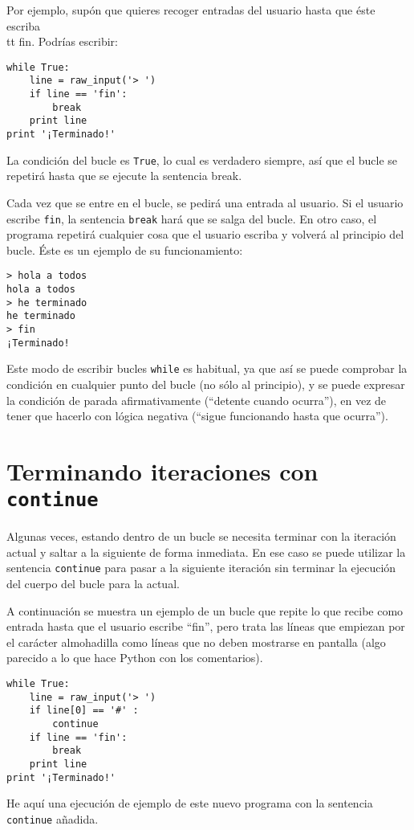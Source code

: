 Por ejemplo, supón que quieres recoger entradas del usuario hasta que
éste escriba {\\tt fin}. Podrías escribir:

\beforeverb
\begin{verbatim}
while True:
    line = raw_input('> ')
    if line == 'fin':
        break
    print line
print '¡Terminado!'
\end{verbatim}
\afterverb
%
La condición del bucle es {\tt True}, lo cual es verdadero siempre, así que
el bucle se repetirá hasta que se ejecute la sentencia break.

Cada vez que se entre en el bucle, se pedirá una entrada al usuario.
Si el usuario escribe {\tt fin}, la sentencia {\tt break} hará que se
salga del bucle. En otro caso, el programa repetirá cualquier cosa que el usuario
escriba y volverá al principio del bucle. Éste es un ejemplo de su funcionamiento:

\beforeverb
\begin{verbatim}
> hola a todos
hola a todos
> he terminado
he terminado
> fin
¡Terminado!
\end{verbatim}
\afterverb
%
Este modo de escribir bucles {\tt while} es habitual, ya que
así se puede comprobar la condición en cualquier punto del
bucle (no sólo al principio), y se puede expresar la condición de parada
afirmativamente (``detente cuando ocurra''), en vez de tener que hacerlo con lógica negativa
(``sigue funcionando hasta que ocurra'').

\section{Terminando iteraciones con {\tt continue}}

Algunas veces, estando dentro de un bucle se necesita
terminar con la iteración actual y saltar a la siguiente de forma inmediata.
En ese caso se puede utilizar la sentencia
{\tt continue} para pasar a la siguiente iteración sin terminar
la ejecución del cuerpo del bucle para la actual.

A continuación se muestra un ejemplo de un bucle que repite lo que recibe como entrada hasta que
el usuario escribe ``fin'', pero trata las líneas que empiezan por el carácter almohadilla
como líneas que no deben mostrarse en pantalla (algo parecido a lo que hace Python con los comentarios).

\beforeverb
\begin{verbatim}
while True:
    line = raw_input('> ')
    if line[0] == '#' :
        continue
    if line == 'fin':
        break
    print line
print '¡Terminado!'
\end{verbatim}
\afterverb
%
He aquí una ejecución de ejemplo de este nuevo programa con la sentencia {\tt continue} añadida.

